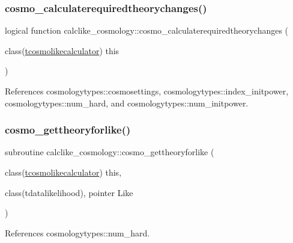 \subsubsection{\texorpdfstring{cosmo\+\_\+calculaterequiredtheorychanges()}{cosmo\_calculaterequiredtheorychanges()}}
{\footnotesize\ttfamily logical function calclike\+\_\+cosmology\+::cosmo\+\_\+calculaterequiredtheorychanges (\begin{DoxyParamCaption}\item[{class(\mbox{\hyperlink{structcalclike__cosmology_1_1tcosmolikecalculator}{tcosmolikecalculator}})}]{this }\end{DoxyParamCaption})\hspace{0.3cm}{\ttfamily [private]}}



References cosmologytypes\+::cosmosettings, cosmologytypes\+::index\+\_\+initpower, cosmologytypes\+::num\+\_\+hard, and cosmologytypes\+::num\+\_\+initpower.

\mbox{\label{namespacecalclike__cosmology_a6f159ab28e06f381042c55c451a060a9}} 
\subsubsection{\texorpdfstring{cosmo\+\_\+gettheoryforlike()}{cosmo\_gettheoryforlike()}}
{\footnotesize\ttfamily subroutine calclike\+\_\+cosmology\+::cosmo\+\_\+gettheoryforlike (\begin{DoxyParamCaption}\item[{class(\mbox{\hyperlink{structcalclike__cosmology_1_1tcosmolikecalculator}{tcosmolikecalculator}})}]{this,  }\item[{class(tdatalikelihood), pointer}]{Like }\end{DoxyParamCaption})\hspace{0.3cm}{\ttfamily [private]}}



References cosmologytypes\+::num\+\_\+hard.

\mbox{\label{namespacecalclike__cosmology_afcac4304981be0a09f45f15d9194e427}} 
